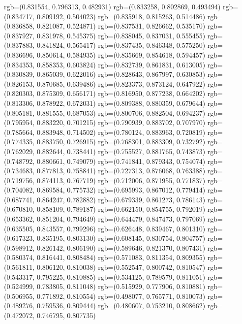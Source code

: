 {{{					rgb=(0.831554, 0.796313, 0.482931)
					rgb=(0.833258, 0.802869, 0.493494)
					rgb=(0.834717, 0.809192, 0.504023)
					rgb=(0.835918, 0.815263, 0.514486)
					rgb=(0.836858, 0.821087, 0.524871)
					rgb=(0.837531, 0.826662, 0.535170)
					rgb=(0.837927, 0.831978, 0.545375)
					rgb=(0.838045, 0.837031, 0.555455)
					rgb=(0.837883, 0.841824, 0.565417)
					rgb=(0.837435, 0.846348, 0.575250)
					rgb=(0.836696, 0.850614, 0.584935)
					rgb=(0.835669, 0.854618, 0.594457)
					rgb=(0.834353, 0.858353, 0.603824)
					rgb=(0.832739, 0.861831, 0.613005)
					rgb=(0.830839, 0.865039, 0.622016)
					rgb=(0.828643, 0.867997, 0.630853)
					rgb=(0.826153, 0.870685, 0.639486)
					rgb=(0.823373, 0.873124, 0.647922)
					rgb=(0.820303, 0.875309, 0.656171)
					rgb=(0.816950, 0.877238, 0.664202)
					rgb=(0.813306, 0.878922, 0.672031)
					rgb=(0.809388, 0.880359, 0.679644)
					rgb=(0.805181, 0.881555, 0.687053)
					rgb=(0.800706, 0.882504, 0.694237)
					rgb=(0.795954, 0.883220, 0.701215)
					rgb=(0.790939, 0.883702, 0.707970)
					rgb=(0.785664, 0.883948, 0.714502)
					rgb=(0.780124, 0.883963, 0.720819)
					rgb=(0.774335, 0.883750, 0.726915)
					rgb=(0.768301, 0.883309, 0.732792)
					rgb=(0.762029, 0.882644, 0.738441)
					rgb=(0.755527, 0.881765, 0.743873)
					rgb=(0.748792, 0.880661, 0.749079)
					rgb=(0.741841, 0.879343, 0.754074)
					rgb=(0.734683, 0.877813, 0.758841)
					rgb=(0.727313, 0.876068, 0.763388)
					rgb=(0.719756, 0.874113, 0.767719)
					rgb=(0.712006, 0.871955, 0.771837)
					rgb=(0.704082, 0.869584, 0.775732)
					rgb=(0.695993, 0.867012, 0.779414)
					rgb=(0.687741, 0.864247, 0.782882)
					rgb=(0.679339, 0.861273, 0.786143)
					rgb=(0.670810, 0.858109, 0.789187)
					rgb=(0.662150, 0.854755, 0.792019)
					rgb=(0.653362, 0.851204, 0.794649)
					rgb=(0.644479, 0.847473, 0.797069)
					rgb=(0.635505, 0.843557, 0.799296)
					rgb=(0.626448, 0.839467, 0.801310)
					rgb=(0.617323, 0.835195, 0.803130)
					rgb=(0.608145, 0.830754, 0.804757)
					rgb=(0.598912, 0.826142, 0.806190)
					rgb=(0.589646, 0.821370, 0.807431)
					rgb=(0.580374, 0.816441, 0.808484)
					rgb=(0.571083, 0.811354, 0.809355)
					rgb=(0.561811, 0.806120, 0.810038)
					rgb=(0.552547, 0.800742, 0.810547)
					rgb=(0.543317, 0.795225, 0.810885)
					rgb=(0.534125, 0.789579, 0.811051)
					rgb=(0.524999, 0.783805, 0.811048)
					rgb=(0.515929, 0.777906, 0.810881)
					rgb=(0.506955, 0.771892, 0.810554)
					rgb=(0.498077, 0.765771, 0.810073)
					rgb=(0.489276, 0.759536, 0.809444)
					rgb=(0.480607, 0.753210, 0.808662)
					rgb=(0.472072, 0.746795, 0.807735)
}}}
